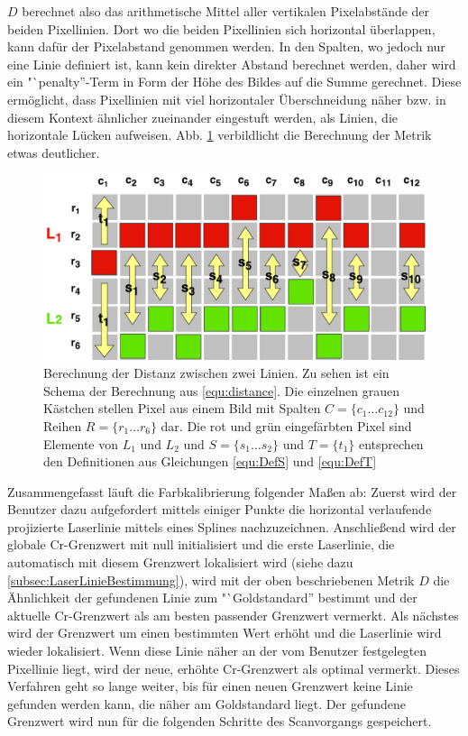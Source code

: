 \(D\) berechnet also das arithmetische Mittel aller vertikalen Pixelabstände der beiden Pixellinien. Dort wo die beiden Pixellinien sich horizontal überlappen, kann dafür der Pixelabstand genommen werden. In den Spalten, wo jedoch nur eine Linie definiert ist, kann kein direkter Abstand berechnet werden, daher wird ein "`penalty''-Term in Form der Höhe des Bildes auf die Summe gerechnet. Diese ermöglicht, dass Pixellinien mit viel horizontaler Überschneidung näher bzw. in diesem Kontext ähnlicher zueinander eingestuft werden, als Linien, die horizontale Lücken aufweisen. Abb. \ref{fig:LineDistanceSchematic} verbildlicht die Berechnung der Metrik etwas deutlicher. 
\begin{figure}
\centering \includegraphics[width=\textwidth]{images/LineDistance.pdf}
\caption{Berechnung der Distanz zwischen zwei Linien. Zu sehen ist ein Schema der Berechnung aus \ref{equ:distance}. Die einzelnen grauen Kästchen stellen Pixel aus einem Bild mit Spalten \(C = \lbrace c_{1} \ldots c_{12} \rbrace\) und Reihen \(R = \lbrace r_{1} \ldots r_{6} \rbrace\) dar. Die rot und grün eingefärbten Pixel sind Elemente von \(L_{1}\) und \(L_{2}\) und \(S = \lbrace s_{1} \ldots s_{2} \rbrace\) und \(T = \lbrace t_{1} \rbrace\) entsprechen den Definitionen aus Gleichungen \ref{equ:DefS} und \ref{equ:DefT}}\label{fig:LineDistanceSchematic}
\end{figure}
\bigbreak
Zusammengefasst läuft die Farbkalibrierung folgender Maßen ab: Zuerst wird der Benutzer dazu aufgefordert mittels einiger Punkte die horizontal verlaufende projizierte Laserlinie mittels eines Splines nachzuzeichnen. Anschließend wird der globale Cr-Grenzwert mit null initialisiert und die erste Laserlinie, die automatisch mit diesem Grenzwert lokalisiert wird (siehe dazu \ref{subsec:LaserLinieBestimmung}), wird mit der oben beschriebenen Metrik \(D\) die Ähnlichkeit der gefundenen Linie zum "`Goldstandard'' bestimmt und der aktuelle Cr-Grenzwert als am besten passender Grenzwert vermerkt. Als nächstes wird der Grenzwert um einen bestimmten Wert erhöht und die Laserlinie wird wieder lokalisiert. Wenn diese Linie näher an der vom Benutzer festgelegten Pixellinie liegt, wird der neue, erhöhte Cr-Grenzwert als optimal vermerkt. Dieses Verfahren geht so lange weiter, bis für einen neuen Grenzwert keine Linie gefunden werden kann, die näher am Goldstandard liegt. Der gefundene Grenzwert wird nun für die folgenden Schritte des Scanvorgangs gespeichert.


